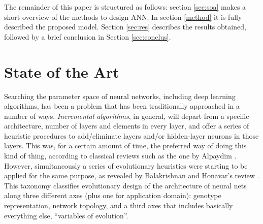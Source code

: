\documentclass[runningheads]{llncs}
\begin{document}
The remainder of this paper is structured as follows: 
section \ref{sec:soa} makes a short overview of the methods to design ANN.
In section \ref{method} it is fully described the proposed model.
Section \ref{sec:res} describes the results obtained, 
followed by a brief conclusion in Section \ref{sec:conclus}.

\section{State of the Art}
\label{soa}

Searching the parameter space of neural networks, including deep
learning algorithms, has been a problem that has been traditionally
approached in a number of ways. {\em Incremental algorithms}, in
general, will depart from a specific architecture, number of layers
and elements in every layer, and offer a series of heuristic
procedures to add/eliminate layers and/or hidden-layer neurons in
those layers. This was, for a certain amount of time, the preferred
way of doing this kind of thing, according to classical reviews such
as the one by Alpaydim \cite{Alpaydim}. However, simultaneously a
series of evolutionary heuristics were starting to be applied for the
same purpose, as revealed by Balakrishnan and Honavar's review
\cite{balakrishnan95:EDNA}. This taxonomy classifies evolutionary
design of the architecture of neural nets along three different axes
(plus one for application domain): genotype representation, network
topology, and a third axes that includes basically everything else,
``variables of evolution''.
\end{document}
